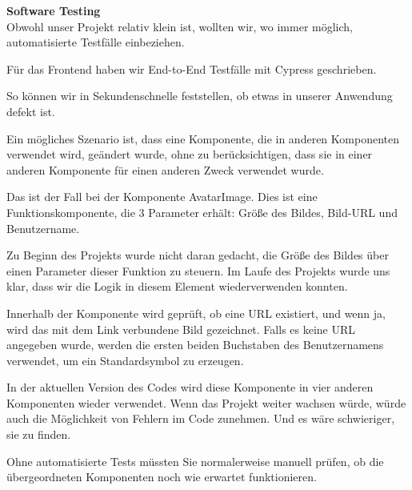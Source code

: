 \textbf{Software Testing }\\
Obwohl unser Projekt relativ klein ist, wollten wir, wo immer möglich, automatisierte Testfälle einbeziehen.

Für das Frontend haben wir End-to-End Testfälle mit Cypress geschrieben.

So können wir in Sekundenschnelle feststellen, ob etwas in unserer Anwendung defekt ist.

Ein mögliches Szenario ist, dass eine Komponente, die in anderen Komponenten verwendet wird, geändert wurde, ohne zu berücksichtigen, dass sie in einer anderen Komponente für einen anderen Zweck verwendet wurde.

Das ist der Fall bei der Komponente AvatarImage.
Dies ist eine Funktionskomponente, die 3 Parameter erhält: Größe des Bildes, Bild-URL und Benutzername.

Zu Beginn des Projekts wurde nicht daran gedacht, die Größe des Bildes über einen Parameter dieser Funktion zu steuern. Im Laufe des Projekts wurde uns klar, dass wir die Logik in diesem Element wiederverwenden konnten.

Innerhalb der Komponente wird geprüft, ob eine URL existiert, und wenn ja, wird das mit dem Link verbundene Bild gezeichnet. Falls es keine URL  angegeben wurde, werden die ersten beiden Buchstaben des Benutzernamens verwendet, um ein Standardsymbol zu erzeugen.

In der aktuellen Version des Codes wird diese Komponente in vier anderen Komponenten wieder verwendet.
Wenn das Projekt weiter wachsen würde, würde auch die Möglichkeit von Fehlern im Code zunehmen. Und es wäre schwieriger, sie zu finden.

Ohne automatisierte Tests müssten Sie normalerweise manuell prüfen, ob die übergeordneten Komponenten noch wie erwartet funktionieren.


